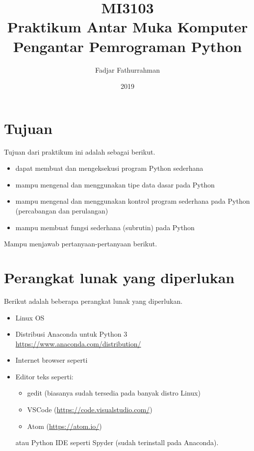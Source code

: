 \documentclass[a4paper,11pt]{extarticle}
\title{
MI3103 \\
Praktikum Antar Muka Komputer\\
Pengantar Pemrograman Python}
\author{Fadjar Fathurrahman}
\date{2019}
\begin{document}
\maketitle

\section{Tujuan}
Tujuan dari praktikum ini adalah sebagai berikut.
\begin{itemize}
\item dapat membuat dan mengeksekusi program Python sederhana
\item mampu mengenal dan menggunakan tipe data dasar pada Python
\item mampu mengenal dan menggunakan kontrol program sederhana pada Python (percabangan dan
perulangan)
\item mampu membuat fungsi sederhana (subrutin) pada Python
\end{itemize}

Mampu menjawab pertanyaan-pertanyaan berikut.


\section{Perangkat lunak yang diperlukan}

Berikut adalah beberapa perangkat lunak yang diperlukan.

\begin{itemize}
\item Linux OS
\item Distribusi \textsf{Anaconda} untuk Python 3 \url{https://www.anaconda.com/distribution/}
\item Internet browser seperti 
\item Editor teks seperti:
  \begin{itemize}
  \item \textsf{gedit} (biasanya sudah tersedia pada banyak distro Linux)
  \item \textsf{VSCode} (\url{https://code.visualstudio.com/})
  \item \textsf{Atom} (\url{https://atom.io/})
  \end{itemize}
atau Python IDE seperti \textsf{Spyder} (sudah terinstall pada \textsf{Anaconda}).
\end{itemize}

\end{document}
